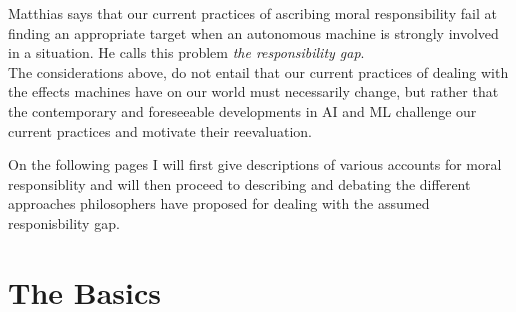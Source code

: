 \documentclass{article}
\begin{document}
Matthias says that our current practices of ascribing moral responsibility
fail at finding an appropriate target when an autonomous machine is
strongly involved in a situation. He calls this problem \textit{the
responsibility gap}.\\

The considerations above, do not entail that our current practices of
dealing with the effects machines have on our world must necessarily change,
but rather that the contemporary and foreseeable developments in AI and ML
challenge our current practices and motivate their reevaluation.

On the following pages I will first give descriptions of various accounts for
moral responsiblity and will then proceed to describing and debating the
different approaches philosophers have proposed for dealing with the assumed
responisbility gap.

%
%
%
%
%
\newpage
\section{The Basics}
\end{document}
